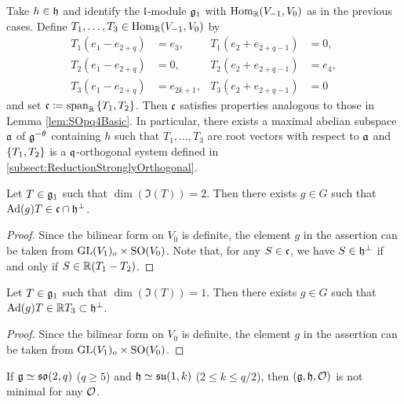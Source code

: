 Take $h \in \mathfrak{h}$ and identify the $\mathfrak{l}$-module $\mathfrak{g}_1$ with $\mathrm{Hom}_{\mathbb{R}}(V_{-1}, V_0)$ as in the previous cases.
Define $T_1, \ldots, T_3 \in \mathrm{Hom}_{\mathbb{R}}(V_{-1}, V_0)$ by
\begin{align*}
	T_1(e_1 - e_{2+q}) &= e_3, & T_1(e_2 + e_{2+q-1}) &= 0, \\
	T_2(e_1 - e_{2+q}) &= 0, & T_2(e_2 + e_{2+q-1}) &= e_4, \\
	T_3(e_1 - e_{2+q}) &= e_{2k+1}, & T_3(e_2 + e_{2+q-1}) &= 0
\end{align*}
and set $\mathfrak{c} \coloneq \mathrm{span}_{\mathbb{R}}\left\{T_1, T_2\right\}$.
Then $\mathfrak{c}$ satisfies properties analogous to those in Lemma \ref{lem:SOpq4Basic}.
In particular, there exists a maximal abelian subspace $\mathfrak{a}$ of $\mathfrak{g}^{-\theta}$ containing $h$ such that
$T_1, \ldots, T_3$ are root vectors with respect to $\mathfrak{a}$ and $\left\{T_1, T_2 \right\}$ is a $\mathfrak{q}$-orthogonal system defined in \ref{subsect:ReductionStronglyOrthogonal}.

\begin{lemma} \label{lem:SOpq2-nondegenerate}
	Let $T \in \mathfrak{g}_1$ such that $\dim(\Im(T)) = 2$.
	Then there exists $g \in G$ such that $\mathrm{Ad}(g)T \in \mathfrak{c} \cap \mathfrak{h}^\perp$.
\end{lemma}

\begin{proof}
	Since the bilinear form on $V_0$ is definite, the element $g$ in the assertion can be taken from $\mathrm{GL}(V_1)_o\times \mathrm{SO}(V_0)$.
	Note that, for any $S \in \mathfrak{c}$, we have $S \in \mathfrak{h}^\perp$ if and only if $S \in \mathbb{R}(T_1 - T_2)$.
\end{proof}

\begin{lemma} \label{lem:SOpq2-degenerate}
	Let $T \in \mathfrak{g}_1$ such that $\dim(\Im(T)) = 1$.
	Then there exists $g \in G$ such that $\mathrm{Ad}(g)T \in \mathbb{R} T_3 \subset \mathfrak{h}^\perp$.
\end{lemma}

\begin{proof}
	Since the bilinear form on $V_0$ is definite, the element $g$ in the assertion can be taken from $\mathrm{GL}(V_1)_o\times \mathrm{SO}(V_0)$.
\end{proof}

\begin{theorem} \label{thm:SOpq2}
	If $\mathfrak{g} \simeq \mathfrak{so}(2, q)$ ($q \geq 5$) and $\mathfrak{h} \simeq \mathfrak{su}(1, k)$ ($2\leq k\leq q/2$), then $(\mathfrak{g}, \mathfrak{h}, \mathcal{O})$ is not minimal for any $\mathcal{O}$.
\end{theorem}

